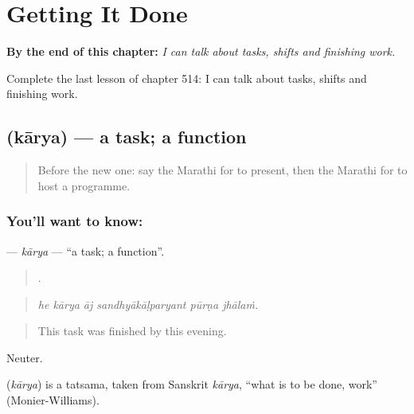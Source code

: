 
\chapter{Getting It Done}
\label{ch:mr-getting-it-done}

\begin{chapteropening}
\textbf{By the end of this chapter:} \emph{I can talk about tasks, shifts and finishing work.}

Complete the last lesson of chapter 514: I can talk about tasks, shifts and finishing work.
\end{chapteropening}

\section[\texorpdfstring{\mr{कार्य} (kārya)}{कार्य (kārya)}]{ (kārya) — a task; a function}

\label{lesson:MR-C514-karya}



\begin{quote}
Before the new one: say the Marathi for to present, then the Marathi for to host a programme.
\end{quote}

\subsection*{You'll want to know: }
\textbf{} — \emph{kārya} — \textquotedblleft{}a task; a function\textquotedblright{}.

\begin{quote}
     .
\end{quote}

\begin{quote}
\emph{he kārya āj sandhyākāḷparyant pūrṇa jhālaṁ.}
\end{quote}

\begin{quote}
This task was finished by this evening.
\end{quote}

Neuter.

\begin{cousinweb}
\textbf{} (\emph{kārya}) is a tatsama, taken from Sanskrit \emph{kārya}, \textquotedblleft{}what is to be done, work\textquotedblright{} (Monier-Williams).
\end{cousinweb}

